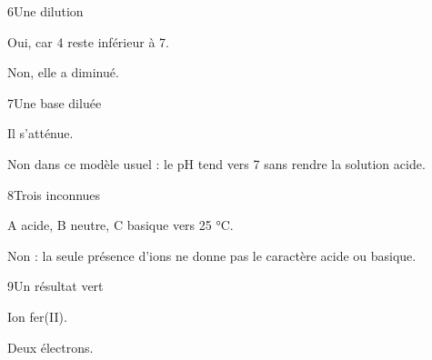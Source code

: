 \par\noindent\begin{minipage}{\linewidth}
\begin{corrige}{6}{Une dilution}
\begin{questions}
\item Oui, car 4 reste inférieur à 7.
\item Non, elle a diminué.
\end{questions}
\end{corrige}
\end{minipage}
\par\noindent\begin{minipage}{\linewidth}
\begin{corrige}{7}{Une base diluée}
\begin{questions}
\item Il s’atténue.
\item Non dans ce modèle usuel : le pH tend vers 7 sans rendre la solution acide.
\end{questions}
\end{corrige}
\end{minipage}
\par\noindent\begin{minipage}{\linewidth}
\begin{corrige}{8}{Trois inconnues}
\begin{questions}
\item A acide, B neutre, C basique vers 25 °C.
\item Non : la seule présence d’ions ne donne pas le caractère acide ou basique.
\end{questions}
\end{corrige}
\end{minipage}
\par\noindent\begin{minipage}{\linewidth}
\begin{corrige}{9}{Un résultat vert}
\begin{questions}
\item Ion fer(II).
\item Deux électrons.
\end{questions}
\end{corrige}
\end{minipage}
